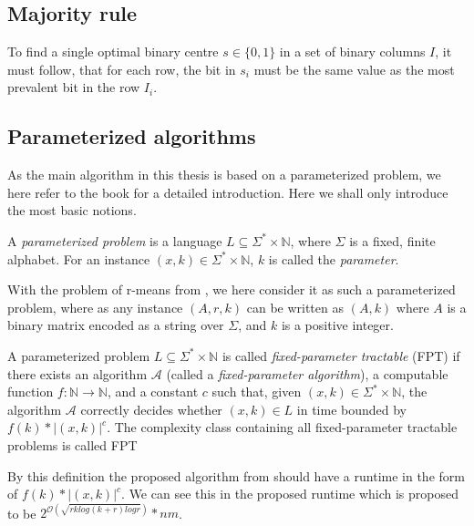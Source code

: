 \documentclass[a4paper]{article}
\begin{document}
\subsection{Majority rule}
To find a single optimal binary centre $s \in \{0,1\}$ in a set of binary columns $I$, it must follow, that for each row,
the bit in $s_i$ must be the same value as the most prevalent bit in the row $I_i$.

\subsection{Parameterized algorithms}
As the main algorithm in this thesis is based on a parameterized problem, we here refer to the
book \cite{param_algo_book} for a detailed introduction. Here we shall only introduce the most
basic notions.

\begin{theoremdefinition}
    A \textit{parameterized problem} is a language $L \subseteq \Sigma^* \times \mathbb{N}$,
    where $\Sigma$ is a fixed, finite alphabet. For an instance $(x,k) \in \Sigma^* \times \mathbb{N}$,
    $k$ is called the \textit{parameter}. \cite[p.~12]{param_algo_book}
\end{theoremdefinition}

With the problem of r-means from \cite{fomin_golovach_panolan_2020}, we here consider it as such
a parameterized problem, where as any instance $(A,r,k)$
can be written as $(A, k)$ where $A$ is a binary matrix encoded as a string over $\Sigma$, and
$k$ is a positive integer.

\begin{theoremdefinition}
    A parameterized problem $L \subseteq \Sigma^* \times \mathbb{N}$ is called
    \textit{fixed-parameter tractable} (FPT) if there exists an algorithm $\mathcal{A}$ (called
    a \textit{fixed-parameter algorithm}), a computable function $f:\mathbb{N} \rightarrow \mathbb{N}$,
    and a constant $c$ such that, given $(x,k) \in \Sigma^* \times \mathbb{N}$, the algorithm
    $\mathcal{A}$ correctly decides whether $(x,k) \in L$ in time bounded by $f(k) * |(x,k)|^c$.
    The complexity class containing all fixed-parameter tractable problems is called FPT \cite[p.~13]{param_algo_book}
\end{theoremdefinition}

By this definition the proposed algorithm from \cite{fomin_golovach_panolan_2020} should have
a runtime in the form of $f(k) * |(x,k)|^c$. We can see this in the proposed runtime which is
proposed to be $2^{\mathcal{O} (\sqrt{rk log(k+r) logr})}*nm$.
\end{document}
